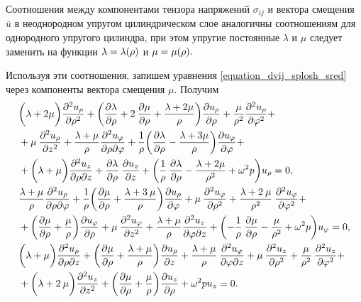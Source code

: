 Соотношения между компонентами тензора напряжений $\sigma_{ij}$ и вектора смещения $\bar{u}$ в неоднородном упругом цилиндрическом слое аналогичны соотношениям для однородного упругого цилиндра, при этом упругие постоянные $\lambda$ и $\mu$ следует заменить на функции $\lambda=\lambda(\rho)$ и $\mu=\mu(\rho).$

Используя эти соотношения, запишем уравнения \eqref{equation_dvij_splosh_sred} через компоненты вектора смещения $\mu.$ Получим
\begin{equation}\label{equation_otn_u}
\begin{aligned}
&\biggl(\lambda+2\mu\biggr)\frac{\partial^2u_{\rho}}{\partial \rho^2}+\biggl(\frac{\partial\lambda}{\partial \rho}+2\:\frac{\partial\mu}{\partial \rho}+\frac{\lambda+2\mu}{\rho}\biggr)\frac{\partial u_{\rho}}{\partial \rho}+\frac{\mu}{\rho^2}\frac{\partial^2 u_{\rho}}{\partial \varphi^2}+\\
&+\mu\:\frac{\partial^2 u_{\rho}}{\partial z^2}+\frac{\lambda+\mu}{\rho}\frac{\partial^2 u_{\varphi}}{\partial \rho\partial\varphi}+\frac{1}{\rho}\biggl(\frac{\partial\lambda}{\partial \rho}-\frac{\lambda+3\mu}{\rho}\biggr)\frac{\partial u_{\varphi}}{\partial\varphi}+\\
&+\biggl(\lambda+\mu\biggr)\frac{\partial^2 u_z}{\partial \rho\partial z}+\frac{\partial\lambda}{\partial \rho}\:\frac{\partial u_z}{\partial z}+\biggl(\frac{1}{\rho}\:\frac{\partial\lambda}{\partial \rho}-\frac{\lambda+2\mu}{\rho^2}+\omega^2 p\biggr)u_{\rho}=0,\\
&\frac{\lambda+\mu}{\rho}\frac{\partial^2u_{\rho}}{\partial \rho\partial\varphi}+\frac{1}{\rho}\biggl(\frac{\partial\mu}{\partial \rho}+\frac{\lambda+3\:\mu}{\rho}\biggr)\frac{\partial u_{\rho}}{\partial\varphi}+\mu\:\frac{\partial^2 u_{\varphi}}{\partial \rho^2}+\frac{\lambda+2\:\mu}{\rho^2}\:\frac{\partial^2 u_{\varphi}}{\partial \varphi^2}+\\
&+\biggl(\frac{\partial\mu}{\partial \rho}+\frac{\mu}{\rho}\biggr)\frac{\partial u_{\varphi}}{\partial \rho}+\mu\:\frac{\partial^2 u_{\varphi}}{\partial z^2}+\frac{\lambda+\mu}{\rho}\frac{\partial^2 u_z}{\partial \varphi\partial z}+\biggl(-\frac{1}{\rho}\:\frac{\partial\mu}{\partial \rho}-\frac{\mu}{\rho^2}+\omega^2 p\biggr)u_{\varphi}=0,\\
&\biggl(\lambda+\mu\biggr)\frac{\partial^2u_{\rho}}{\partial \rho\partial z}+\biggl(\frac{\partial\mu}{\partial \rho}+\frac{\lambda+\mu}{\rho}\biggr)\frac{\partial u_{\rho}}{\partial z}+\frac{\lambda+\mu}{\rho}\:\frac{\partial^2 u_{\varphi}}{\partial \varphi\partial z}+\mu\:\frac{\partial^2 u_z}{\partial \rho^2}+\frac{\mu}{\rho^2}\:\frac{\partial^2 u_z}{\partial {\varphi}^2}+\\
&+\biggl(\lambda+2\:\mu\biggr)\frac{\partial^2 u_z}{\partial z^2}+\biggl(\frac{\partial\mu}{\partial \rho}+\frac{\mu}{\rho}\biggr)\frac{\partial u_z}{\partial \rho}+\omega^2 pu_z=0.
\end{aligned}
\end{equation}

